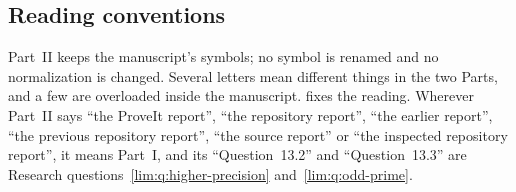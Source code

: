 \documentclass[11pt]{article}
\theoremstyle{definition}
\theoremstyle{remark}
\begin{document}
\subsection{Reading conventions}
\label{lim:dsd:sec:notation}

Part~II keeps the manuscript's symbols; no symbol is renamed and no
normalization is changed. Several letters mean different things in the two
Parts, and a few are overloaded inside the manuscript.
 fixes the reading. Wherever Part~II says ``the
ProveIt report'', ``the repository report'', ``the earlier report'', ``the
previous repository report'', ``the source report'' or ``the inspected
repository report'', it means Part~I, and its ``Question~13.2'' and
``Question~13.3'' are Research questions~\ref{lim:q:higher-precision}
and~\ref{lim:q:odd-prime}.
\end{document}

